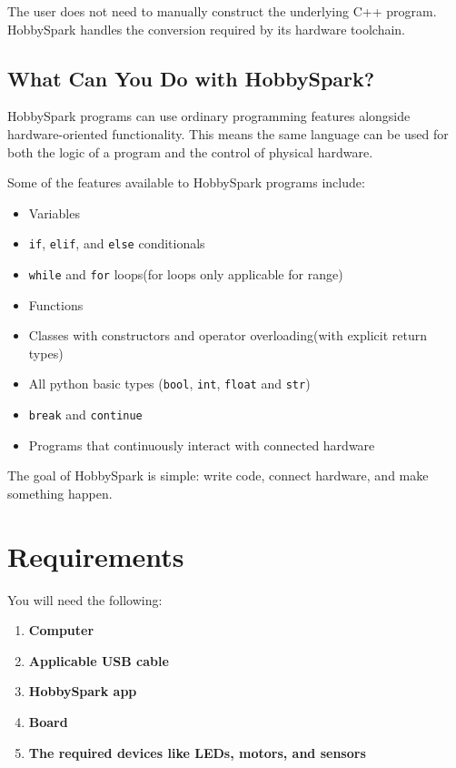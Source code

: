 The user does not need to manually construct the underlying C++
program. HobbySpark handles the conversion required by its hardware
toolchain.

\subsection{What Can You Do with HobbySpark?}

HobbySpark programs can use ordinary programming features alongside
hardware-oriented functionality. This means the same language can be
used for both the logic of a program and the control of physical
hardware.

Some of the features available to HobbySpark programs include:

\begin{itemize}
	\item Variables
	\item \texttt{if}, \texttt{elif}, and \texttt{else} conditionals
	\item \texttt{while} and \texttt{for} loops(for loops only applicable for range)
	\item Functions
	\item Classes with constructors and operator overloading(with explicit return types)
	\item All python basic types (\texttt{bool}, \texttt{int}, \texttt{float} and \texttt{str})
	\item \texttt{break} and \texttt{continue}
	\item Programs that continuously interact with connected
	hardware
\end{itemize}

The goal of HobbySpark is simple: write code, connect hardware, and
make something happen.

\section{Requirements}
You will need the following:
\begin{enumerate}
	\item \textbf{Computer}
	\item \textbf{Applicable USB cable}
	\item \textbf{HobbySpark app}
	\item \textbf{Board}
	\item \textbf{The required devices like LEDs, motors, and sensors}
\end{enumerate}
